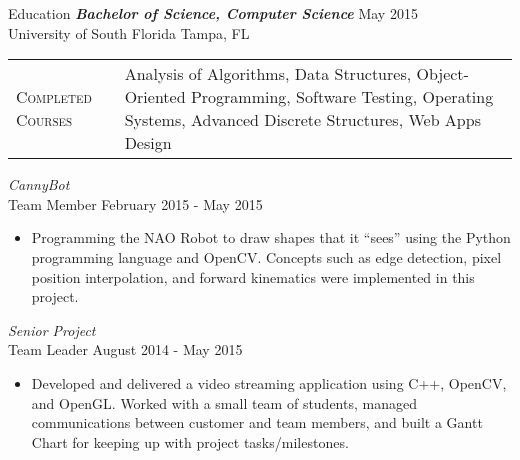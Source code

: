 \begin{section}{Education}
  {\sl \textbf{Bachelor of Science, Computer Science}} \hfill May 2015\\
  University of South Florida \hfill Tampa, FL \\
  \begin{tabularx}{\linewidth}{@{}l X@{}}
    \textsc{Completed Courses} &\small{Analysis of Algorithms, Data Structures, Object-Oriented Programming, Software Testing, Operating Systems, Advanced Discrete Structures, Web Apps Design}\\
  \end{tabularx}

  {\sl CannyBot} \\ Team Member \hfill February 2015 - May 2015
  \begin{itemize}
  \item Programming the NAO Robot to draw shapes that it ``sees'' using the Python programming language and OpenCV. Concepts such as edge detection, pixel position interpolation, and forward kinematics were implemented in this project.
  \end{itemize}
      {\sl Senior Project}  \\ Team Leader \hfill August 2014 - May 2015
      \begin{itemize}
      \item Developed and delivered a video streaming application using C++, OpenCV, and OpenGL. Worked with a small team of students, managed communications between customer and team members, and built a Gantt Chart for keeping up with project tasks/milestones.
      \end{itemize}
\end{section}
